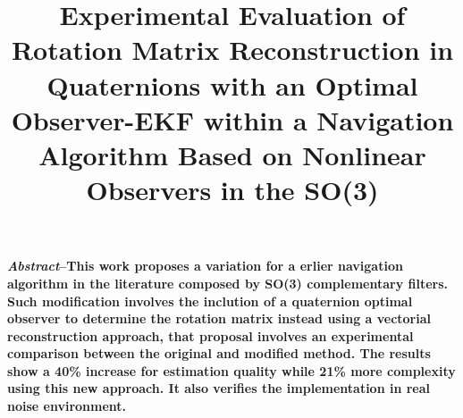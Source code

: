 \documentclass[conference]{IEEEtran}
\begin{document}
%
\title{Experimental Evaluation of Rotation Matrix Reconstruction in Quaternions with an Optimal Observer-EKF within a Navigation Algorithm Based on Nonlinear Observers in the SO(3)}
% 
\author{
}
\maketitle
\textbf{\small \emph{Abstract}--This work proposes a variation for a erlier navigation algorithm in the literature composed by SO(3) complementary filters. Such modification involves the inclution of a quaternion optimal observer to determine  the rotation matrix instead using a vectorial reconstruction approach, that proposal involves an experimental comparison between the original and modified method. The results show a 40\% increase for estimation quality while 21\% more complexity using this new approach. It also verifies the implementation in real noise environment.\\[3mm]}
\end{document}
